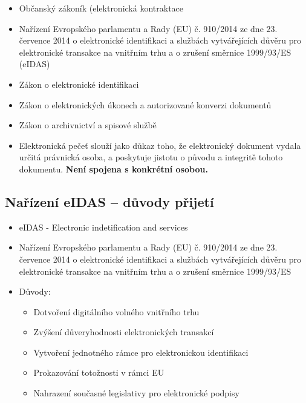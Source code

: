 \begin{itemize}
\begin{enumerate}
\begin{itemize}
        \end{itemize}
    \end{enumerate}
    \item Občanský zákoník (elektronická kontraktace
    \item Nařízení Evropského parlamentu a Rady (EU) č. 910/2014 ze dne 23. července 2014 o elektronické identifikaci 
a službách vytvářejících důvěru pro elektronické transakce na vnitřním trhu a o zrušení směrnice 1999/93/ES 
(eIDAS)
\item Zákon o elektronické identifikaci
\item Zákon o elektronických úkonech a autorizované konverzi dokumentů
\item Zákon o archivnictví a spisové službě
\item  Elektronická pečeť slouží jako důkaz toho, že elektronický dokument vydala určitá právnická osoba, a poskytuje jistotu o původu a integritě tohoto dokumentu. \textbf{Není spojena s konkrétní osobou.}
\end{itemize}

\subsection{Nařízení eIDAS – důvody přijetí}
\begin{itemize}
    \item eIDAS - Electronic indetification and services
    \item Nařízení Evropského parlamentu a Rady (EU) č. 910/2014 ze dne 23. července 2014 o elektronické identifikaci 
a službách vytvářejících důvěru pro elektronické transakce na vnitřním trhu a o zrušení směrnice 1999/93/ES 
\item Důvody:
\begin{itemize}
    \item  Dotvoření digitálního volného vnitřního trhu
    \item Zvýšení důveryhodnosti elektronických transakcí
    \item Vytvoření jednotného rámce pro elektronickou identifikaci
    \item Prokazování totožnosti v rámci EU
    \item Nahrazení současné legislativy pro elektronické podpisy
\end{itemize}
\end{itemize}


